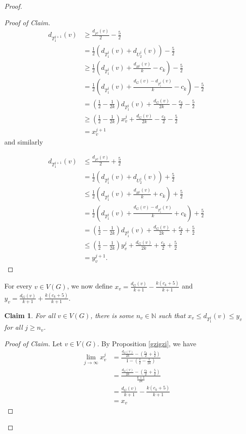 \documentclass{article}
\theoremstyle{plain}
\newtheorem{Claim}{Claim}
\theoremstyle{nonumberplain}
\theoremstyle{nonumberplain}
\begin{document}
\begin{proof}
\begin{proof}[Proof of Claim]
\begin{align*}
d_{T_1^{j+1}}(v)&\geq \frac{d_{F^{j}}(v)}{2}-\frac{5}{2}\\
&=\frac{1}{2}(d_{T_1^{j}}(v)+d_{U_2^{j}}(v))-\frac{5}{2}\\
&\geq \frac{1}{2}(d_{T_1^{j}}(v)+\frac{d_{H^{j}}(v)}{k}-c_k)-\frac{5}{2}\\
&= \frac{1}{2}(d_{T_1^{j}}(v)+\frac{d_G(v)-d_{T_1^{j}}(v)}{k}-c_k)-\frac{5}{2}\\
&=(\frac{1}{2}-\frac{1}{2k})d_{T_1^{j}}(v)+\frac{d_G(v)}{2k}-\frac{c_k}{2}-\frac{5}{2}\\
&\geq (\frac{1}{2}-\frac{1}{2k})x_v^{j}+\frac{d_G(v)}{2k}-\frac{c_k}{2}-\frac{5}{2}\\
&=x_v^{j+1}
\end{align*}
 and similarly 

\begin{align*}
d_{T_1^{j+1}}(v)&\leq \frac{d_{F^{j}}(v)}{2}+\frac{5}{2}\\
&=\frac{1}{2}(d_{T_1^{j}}(v)+d_{U_2^{j}}(v))+\frac{5}{2}\\
&\leq \frac{1}{2}(d_{T_1^{j}}(v)+\frac{d_{H^{j}}(v)}{k}+c_k)+\frac{5}{2}\\
&= \frac{1}{2}(d_{T_1^{j}}(v)+\frac{d_G(v)-d_{T_1^{j}}(v)}{k}+c_k)+\frac{5}{2}\\
&=(\frac{1}{2}-\frac{1}{2k})d_{T_1^{j}}(v)+\frac{d_G(v)}{2k}+\frac{c_k}{2}+\frac{5}{2}\\
&\leq (\frac{1}{2}-\frac{1}{2k})y_v^{j}+\frac{d_G(v)}{2k}+\frac{c_k}{2}+\frac{5}{2}\\
&=y_v^{j+1}.
\end{align*}
\renewcommand{\qedsymbol}{$\blacksquare$}
\end{proof}
For every $v \in V(G)$, we now define $x_v=\frac{d_G(v)}{k+1}-\frac{k(c_k+5)}{k+1}$ and $y_v=\frac{d_G(v)}{k+1}+\frac{k(c_k+5)}{k+1}$.

\begin{Claim}
For all $v \in V(G)$, there is some $n_v \in \mathbb{N}$ such that $x_v \leq d_{T_1^{j}}(v)\leq y_v$ for all $j \geq n_v$.
\end{Claim}
\begin{proof}[Proof of Claim]
Let $v \in V(G)$. By Proposition \ref{gzigzi}, we have 
\begin{align*}
\lim_{j \rightarrow \infty}x_v^{j}&=\frac{\frac{d_G(v)}{2k}-(\frac{c_k}{2}+\frac{5}{2})}{1-(\frac{1}{2}-\frac{1}{2k})}\\
&=\frac{\frac{d_G(v)}{2k}-(\frac{c_k}{2}+\frac{5}{2})}{\frac{k+1}{2k}}\\
&=\frac{d_G(v)}{k+1}-\frac{k(c_k+5)}{k+1}\\
&=x_v
\end{align*}


\end{proof}
\end{proof}
\end{document}
